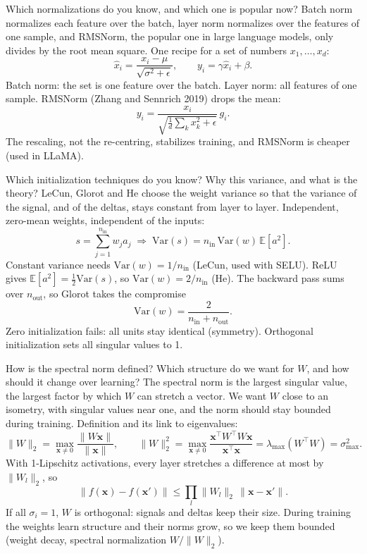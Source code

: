 \begin{qabox}[Hochreiter]{\asked Which normalizations do you know, and which one is popular now?}
\ans Batch norm normalizes each feature over the batch, layer norm normalizes over the features of one sample,
and RMSNorm, the popular one in large language models, only divides by the root mean square.
\formula One recipe for a set of numbers $x_1,\dots,x_d$:
\[ \hat x_i=\frac{x_i-\mu}{\sqrt{\sigma^2+\epsilon}},\qquad y_i=\gamma\hat x_i+\beta . \]
Batch norm: the set is one feature over the batch. Layer norm: all features of one sample. RMSNorm (Zhang and
Sennrich 2019) drops the mean:
\[ y_i=\frac{x_i}{\sqrt{\frac1d\sum_k x_k^2+\epsilon}}\,g_i . \]
The rescaling, not the re-centring, stabilizes training, and RMSNorm is cheaper (used in LLaMA).
\end{qabox}

\begin{qabox}[Hochreiter]{\asked Which initialization techniques do you know? Why this variance, and what is the theory?}
\ans LeCun, Glorot and He choose the weight variance so that the variance of the signal, and of the deltas, stays
constant from layer to layer.
\formula Independent, zero-mean weights, independent of the inputs:
\[ s=\sum_{j=1}^{n_{\text{in}}}w_ja_j\;\Longrightarrow\;\mathrm{Var}(s)=n_{\text{in}}\,\mathrm{Var}(w)\,\mathbb{E}[a^2]. \]
Constant variance needs $\mathrm{Var}(w)=1/n_{\text{in}}$ (LeCun, used with SELU). ReLU gives
$\mathbb{E}[a^2]=\tfrac12\mathrm{Var}(s)$, so $\mathrm{Var}(w)=2/n_{\text{in}}$ (He). The backward pass sums over
$n_{\text{out}}$, so Glorot takes the compromise
\[ \mathrm{Var}(w)=\frac{2}{n_{\text{in}}+n_{\text{out}}}. \]
Zero initialization fails: all units stay identical (symmetry). Orthogonal initialization sets all singular values to 1.
\end{qabox}

\begin{qabox}[Hochreiter]{\asked How is the spectral norm defined? Which structure do we want for $W$, and how should it change over learning?}
\ans The spectral norm is the largest singular value, the largest factor by which $W$ can stretch a vector. We want
$W$ close to an isometry, with singular values near one, and the norm should stay bounded during training.
\formula Definition and its link to eigenvalues:
\[ \|W\|_2=\max_{\mathbf{x}\ne0}\frac{\|W\mathbf{x}\|}{\|\mathbf{x}\|},\qquad \|W\|_2^2=\max_{\mathbf{x}\ne0}\frac{\mathbf{x}^\top W^\top W\mathbf{x}}{\mathbf{x}^\top\mathbf{x}}=\lambda_{\max}(W^\top W)=\sigma_{\max}^2 . \]
With 1-Lipschitz activations, every layer stretches a difference at most by $\|W_l\|_2$, so
\[ \|f(\mathbf{x})-f(\mathbf{x}')\|\le\prod_l\|W_l\|_2\,\|\mathbf{x}-\mathbf{x}'\|. \]
If all $\sigma_i=1$, $W$ is orthogonal: signals and deltas keep their size. During training the weights learn
structure and their norms grow, so we keep them bounded (weight decay, spectral normalization $W/\|W\|_2$).
\end{qabox}

